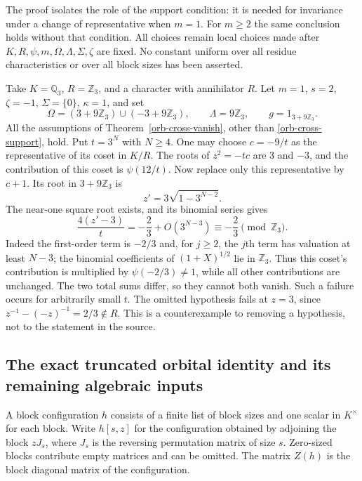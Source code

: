 The proof isolates the role of the support condition: it is needed
for invariance under a change of representative when $m=1$.
For $m\ge2$ the same conclusion holds without that condition.
All choices remain local choices made after $K,R,\psi,m,\Omega,
\Lambda,\Sigma,\zeta$ are fixed.  No constant uniform over
all residue characteristics or over all block sizes has been
asserted.

\begin{remark}[The support condition cannot simply be omitted when $m=1$]
Take $K=\mathbb Q_3$, $R=\mathbb Z_3$, and a character with
annihilator $R$.  Let $m=1$, $s=2$, $\zeta=-1$,
$\Sigma=\{0\}$, $\kappa=1$, and set
\[
 \Omega=(3+9\mathbb Z_3)\cup(-3+9\mathbb Z_3),\qquad
 \Lambda=9\mathbb Z_3,\qquad g=1_{3+9\mathbb Z_3}.
\]
All the assumptions of Theorem~\ref{orb-cross-vanish}, other than
\eqref{orb-cross-support}, hold.  Put $t=3^N$ with $N\ge4$.
One may choose $c=-9/t$ as the representative of its coset in
$K/R$.  The roots of $z^2=-tc$ are $3$ and $-3$, and the
contribution of this coset is $\psi(12/t)$.
Now replace only this representative by $c+1$.  Its root in
$3+9\mathbb Z_3$ is
\[
 z'=3\sqrt{1-3^{N-2}}.
\]
The near-one square root exists, and its binomial series gives
\[
 \frac{4(z'-3)}{t}
       =-\frac23+O(3^{N-3})
       \equiv-\frac23\pmod{\mathbb Z_3}.
\]
Indeed the first-order term is $-2/3$ and, for $j\ge2$, the
$j$th term has valuation at least $N-3$; the binomial
coefficients of $(1+X)^{1/2}$ lie in $\mathbb Z_3$.
Thus this coset's contribution is multiplied by
$\psi(-2/3)\ne1$, while all other contributions are unchanged.
The two total sums differ, so they cannot both vanish.
Such a failure occurs for arbitrarily small $t$.
The omitted hypothesis fails at $z=3$, since
$z^{-1}-(-z)^{-1}=2/3\notin R$.
This is a counterexample to removing a hypothesis, not to the
statement in the source.
\end{remark}

\subsection{The exact truncated orbital identity and its remaining algebraic inputs}

A block configuration $h$ consists of a finite list of block sizes
and one scalar in $K^\times$ for each block.  Write $h[s,z]$ for
the configuration obtained by adjoining the block $zJ_s$, where
$J_s$ is the reversing permutation matrix of size $s$.  Zero-sized
blocks contribute empty matrices and can be omitted.  The matrix
$Z(h)$ is the block diagonal matrix of the configuration.

